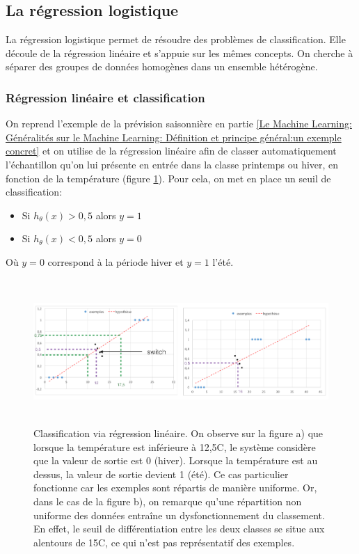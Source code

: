 \subsection{La régression logistique}
\label{Le Machine Learning: Les différents algorithmes: La regression logistique}
La régression logistique permet de résoudre des problèmes de classification. Elle découle de la régression linéaire et s'appuie sur les mêmes concepts.
On cherche à séparer des groupes de données homogènes dans un ensemble hétérogène. 

\subsubsection{Régression linéaire et classification}
\label{Le Machine Learning: Les différents algorithmes: La regression logistique: Régression linéaire et classification}
On reprend l'exemple de la prévision saisonnière en partie \ref{Le Machine Learning: Généralités sur le Machine Learning: Définition et principe général:un exemple concret} et on utilise de la régression linéaire afin de classer automatiquement l'échantillon qu'on lui présente en entrée dans la classe printemps ou hiver, en fonction de la température (figure \ref{fig:Classification via regression linéaire}). 
Pour cela, on met en place un seuil de classification:
\begin{itemize}
	\item Si $h_\theta(x) > 0,5$ alors $y=1$
	\item Si $h_\theta(x) < 0,5$ alors $y=0$
\end{itemize}

Où $y = 0$ correspond à la période hiver et $y = 1$ l'été. 

\begin{figure}[h]
	\centering\includegraphics[height=5.5cm]{images/class_reg_lineaire.png}
	\caption[Classification via régression linéaire]{Classification via régression linéaire. On observe sur la figure a) que lorsque la température est inférieure à 12,5\degres C, le système considère que la valeur de sortie est 0 (hiver). Lorsque la température est au dessus, la valeur de sortie devient 1 (été). Ce cas particulier fonctionne car les exemples sont répartis de manière uniforme. Or, dans le cas de la figure b), on remarque qu'une répartition non uniforme des données entraîne un dysfonctionnement du classement. En effet, le seuil de différentiation entre les deux classes se situe aux alentours de  15\degres C, ce qui n'est pas représentatif des exemples.}
	\label{fig:Classification via regression linéaire}
\end{figure}

